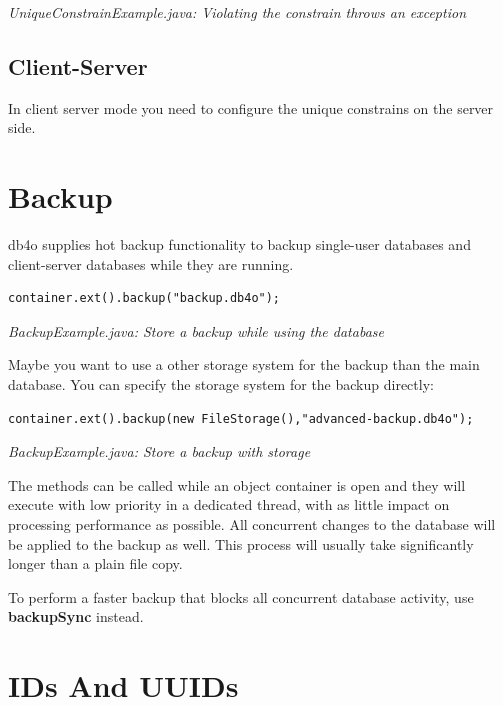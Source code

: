 {\small\itshape UniqueConstrainExample.java: Violating the constrain throws an exception\par}
\medskip

\subsection*{Client-Server}

In client server mode you need to configure the unique constrains on the server side.

\section{Backup}
\label{ref:advanced-topics-backup}

db4o supplies hot backup functionality to backup single-user databases and client-server databases while they are running.

\begin{lstlisting}
container.ext().backup("backup.db4o");
\end{lstlisting}

{\small\itshape BackupExample.java: Store a backup while using the database\par}
\medskip

Maybe you want to use a other storage system for the backup than the main database. You can specify the storage system for the backup directly:

\begin{lstlisting}
container.ext().backup(new FileStorage(),"advanced-backup.db4o");
\end{lstlisting}

{\small\itshape BackupExample.java: Store a backup with storage\par}
\medskip

The methods can be called while an object container is open and they will execute with low priority in a dedicated thread, with as little impact on processing performance as possible. All concurrent changes to the database will be applied to the backup as well. This process will usually take significantly longer than a plain file copy.

To perform a faster backup that blocks all concurrent database activity, use \textbf{backupSync} instead.

\section{IDs And UUIDs}
\label{ref:advanced-topics-ids-and-uuids}

